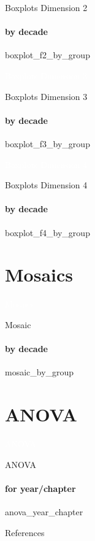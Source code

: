 {\nologo
\begin{frame}{Boxplots Dimension 2}
    \framesubtitle{by decade}
    {boxplot_f2_by_group}
\end{frame}
}

{\nologo
{}
\begin{frame}[c,plain]{}
    \vspace*{1cm}
    \centering
    \Huge
    \textcolor{white}{Boxplots Dimension 3}
\end{frame}
}

{\nologo
\begin{frame}{Boxplots Dimension 3}
    \framesubtitle{by decade}
    {boxplot_f3_by_group}
\end{frame}
}

{\nologo
{}
\begin{frame}[c,plain]{}
    \vspace*{1cm}
    \centering
    \Huge
    \textcolor{white}{Boxplots Dimension 4}
\end{frame}
}

{\nologo
\begin{frame}{Boxplots Dimension 4}
    \framesubtitle{by decade}
    {boxplot_f4_by_group}
\end{frame}
}

\section{Mosaics}

{\nologo
{}
\begin{frame}[c,plain]{}
    \vspace*{1cm}
    \centering
    \Huge
    \textcolor{white}{Mosaics}
\end{frame}
}

{\nologo
\begin{frame}{Mosaic}
    \framesubtitle{by decade}
    {mosaic_by_group}
\end{frame}
}

\section{ANOVA}

{\nologo
{}
\begin{frame}[c,plain]{}
    \vspace*{1cm}
    \centering
    \Huge
    \textcolor{white}{ANOVA}
\end{frame}
}

{\nologo
\begin{frame}{ANOVA}
    \framesubtitle{for year/chapter}
    {anova_year_chapter}
\end{frame}
}

\appendix

{\nologo
\begin{frame}[allowframebreaks]{References}
    \printbibliography
\end{frame}
}
